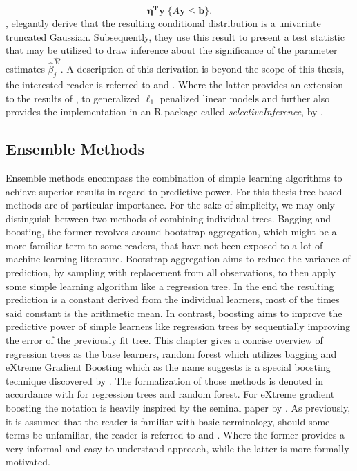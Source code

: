 \documentclass[a4paper,12pt, headsepline]{scrartcl}
\numberwithin{equation}{section}
\begin{document}
\[
\bm{\eta^Ty}|\{A\bm{y} \leq \bm{b}\}.
\]
\citet{Lee2016}, elegantly derive that the resulting conditional distribution is a univariate truncated Gaussian. Subsequently, they use this result to present a test statistic that may be utilized to draw inference about the significance of the parameter estimates $\hat\beta_j^{\hat M}$. A description of this derivation is beyond the scope of this thesis, the interested reader is referred to \citet{Lee2016} and \citet{tib2016}. Where the latter provides an extension to the results of \citet{Lee2016}, to generalized $\ell_1$ penalized linear models and further also provides the implementation in an R package called \textit{selectiveInference}, by \citet{selectiveInference}.

\subsection{Ensemble Methods}\label{subsec:ens}
Ensemble methods encompass the combination of simple learning algorithms to achieve superior results in regard to predictive power. For this thesis tree-based methods are of particular importance. For the sake of simplicity, we may only distinguish between two methods of combining individual trees. Bagging and boosting, the former revolves around bootstrap aggregation, which might be a more familiar term to some readers, that have not been exposed to a lot of machine learning literature. Bootstrap aggregation aims to reduce the variance of prediction, by sampling with replacement from all observations, to then apply some simple learning algorithm like a regression tree. In the end the resulting prediction is a constant derived from the individual learners, most of the times said constant is the arithmetic mean. In contrast, boosting aims to improve the predictive power of simple learners like regression trees by sequentially improving the error of the previously fit tree. This chapter gives a concise overview of regression trees as the base learners, random forest which utilizes bagging and eXtreme Gradient Boosting which as the name suggests is a special boosting technique discovered by \citet{chen2016}. The formalization of those methods is denoted in accordance with \citet{hastie09} for regression trees and random forest. For eXtreme gradient boosting the notation is heavily inspired by the seminal paper by \citet{chen2016}. As previously, it is assumed that the reader is familiar with basic terminology, should some terms be unfamiliar, the reader is referred to \citet{James2013} and \citet{hastie09}. Where the former provides a very informal and easy to understand approach, while the latter is more formally motivated.
\end{document}
